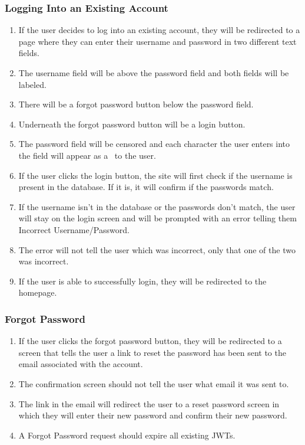     \subsubsection{Logging Into an Existing Account}
        \begin{enumerate}[leftmargin=3\parindent]
            \item If the user decides to log into an existing account, they will be redirected to a page where they can enter their username and password in two different text fields.
            \item The username field will be above the password field and both fields will be labeled.
            \item There will be a forgot password button below the password field.
            \item Underneath the forgot password button will be a login button.
            \item The password field will be censored and each character the user enters into the field will appear as a \textbullet\ to the user.
            \item If the user clicks the login button, the site will first check if the username is present in the database. If it is, it will confirm if the passwords match.
            \item If the username isn't in the database or the passwords don't match, the user will stay on the login screen and will be prompted with an error telling them Incorrect Username/Password.
            \item The error will not tell the user which was incorrect, only that one of the two was incorrect.
            \item If the user is able to successfully login, they will be redirected to the homepage.
        \end{enumerate}
    \subsubsection{Forgot Password}
        \begin{enumerate}[leftmargin=3\parindent]
            \item If the user clicks the forgot password button, they will be redirected to a screen that tells the user a link to reset the password has been sent to the email associated with the account.
            \item The confirmation screen should not tell the user what email it was sent to.
            \item The link in the email will redirect the user to a reset password screen in which they will enter their new password and confirm their new password.
            \item A Forgot Password request should expire all existing JWTs.
        \end{enumerate}
